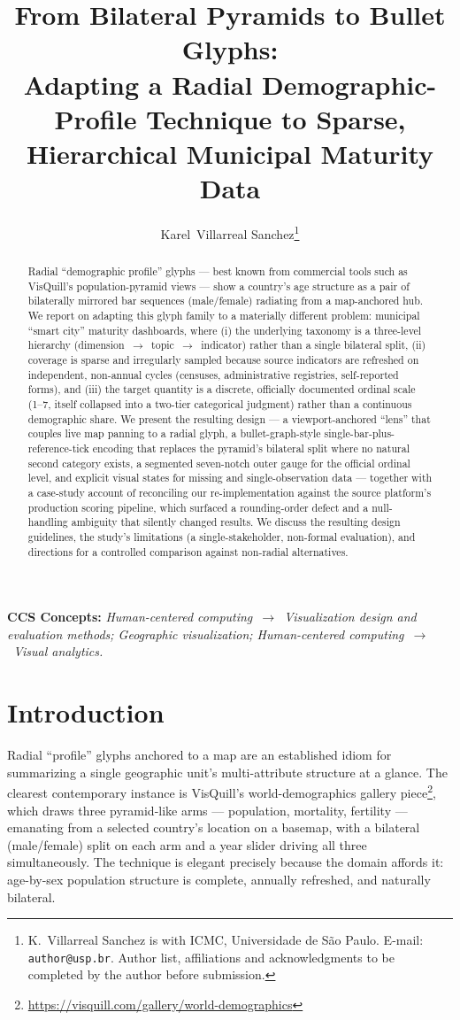 \documentclass[10pt,twocolumn]{article}
\title{\vspace{-1em}\textbf{From Bilateral Pyramids to Bullet Glyphs:\\
Adapting a Radial Demographic-Profile Technique to Sparse,\\
Hierarchical Municipal Maturity Data}}
\author{
Karel~Villarreal Sanchez\thanks{K.~Villarreal Sanchez is with ICMC, Universidade de S\~ao Paulo. E-mail: \texttt{author@usp.br}. Author list, affiliations and acknowledgments to be completed by the author before submission.}
}
\date{}
\begin{document}
\maketitle

\begin{abstract}
Radial ``demographic profile'' glyphs — best known from commercial tools such as VisQuill's population-pyramid views — show a country's age structure as a pair of bilaterally mirrored bar sequences (male/female) radiating from a map-anchored hub. We report on adapting this glyph family to a materially different problem: municipal ``smart city'' maturity dashboards, where (i) the underlying taxonomy is a three-level hierarchy (dimension~$\rightarrow$~topic~$\rightarrow$~indicator) rather than a single bilateral split, (ii) coverage is sparse and irregularly sampled because source indicators are refreshed on independent, non-annual cycles (censuses, administrative registries, self-reported forms), and (iii) the target quantity is a discrete, officially documented ordinal scale (1--7, itself collapsed into a two-tier categorical judgment) rather than a continuous demographic share. We present the resulting design — a viewport-anchored ``lens'' that couples live map panning to a radial glyph, a bullet-graph-style single-bar-plus-reference-tick encoding that replaces the pyramid's bilateral split where no natural second category exists, a segmented seven-notch outer gauge for the official ordinal level, and explicit visual states for missing and single-observation data — together with a case-study account of reconciling our re-implementation against the source platform's production scoring pipeline, which surfaced a rounding-order defect and a null-handling ambiguity that silently changed results. We discuss the resulting design guidelines, the study's limitations (a single-stakeholder, non-formal evaluation), and directions for a controlled comparison against non-radial alternatives.
\end{abstract}

\vspace{0.3em}
\noindent\textbf{CCS Concepts:} \textit{Human-centered computing~$\rightarrow$~Visualization design and evaluation methods; Geographic visualization; Human-centered computing~$\rightarrow$~Visual analytics.}

\vspace{0.6em}

\section{Introduction}
Radial ``profile'' glyphs anchored to a map are an established idiom for summarizing a single geographic unit's multi-attribute structure at a glance. The clearest contemporary instance is VisQuill's world-demographics gallery piece\footnote{\url{https://visquill.com/gallery/world-demographics}}, which draws three pyramid-like arms — population, mortality, fertility — emanating from a selected country's location on a basemap, with a bilateral (male/female) split on each arm and a year slider driving all three simultaneously. The technique is elegant precisely because the domain affords it: age-by-sex population structure is complete, annually refreshed, and naturally bilateral.
\end{document}
